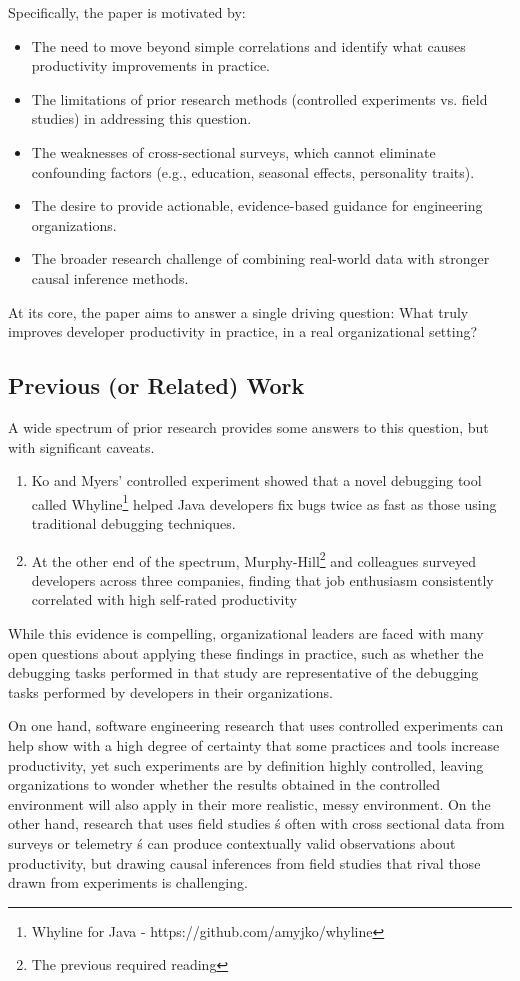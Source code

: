 Specifically, the paper is motivated by:
\begin{itemize}
    \item The need to move beyond simple correlations and identify what causes productivity improvements in practice.
    \item The limitations of prior research methods (controlled experiments vs. field studies) in addressing this question.
    \item The weaknesses of cross-sectional surveys, which cannot eliminate confounding factors (e.g., education, seasonal effects, personality traits).
    \item The desire to provide actionable, evidence-based guidance for engineering organizations.
    \item The broader research challenge of combining real-world data with stronger causal inference methods.
\end{itemize}
At its core, the paper aims to answer a single driving question: What truly improves developer productivity in practice, in a real organizational setting?

\subsection{Previous (or Related) Work}
A wide spectrum of prior research provides some answers to this question, but with significant caveats.
\begin{enumerate}
    \item Ko and Myers' controlled experiment showed that a novel debugging tool called Whyline\footnote{Whyline for Java - https://github.com/amyjko/whyline} helped Java developers fix bugs twice as fast as those using traditional debugging techniques.
    \item At the other end of the spectrum, Murphy-Hill\footnote{The previous required reading} and colleagues surveyed developers across three companies, finding that job enthusiasm consistently correlated with high self-rated productivity
\end{enumerate}
While this evidence is compelling, organizational leaders are faced with many open questions about applying these findings in practice, such as whether the debugging tasks performed in that study are representative of the debugging tasks performed by developers in their organizations.

On one hand, software engineering research that uses controlled experiments can help show with a high degree of certainty that some practices and tools increase productivity, yet such experiments are by definition highly controlled, leaving organizations to wonder whether the results obtained in the controlled environment will also apply in their more realistic, messy environment. On the other hand, research that uses field studies ś often with cross sectional data from surveys or telemetry ś can produce contextually valid observations about productivity, but drawing causal inferences from field studies that rival those drawn from experiments is challenging.

